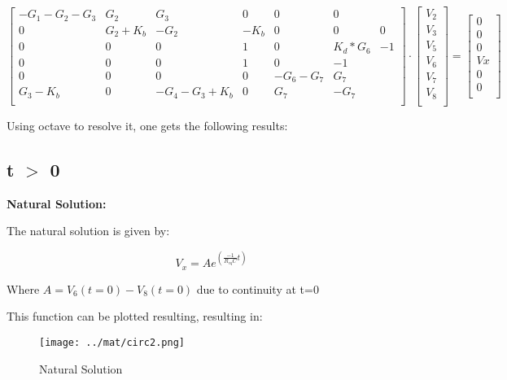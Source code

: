 \[
\begin{bmatrix}
-G_1-G_2-G_3 & G_2 & G_3 &  0 & 0 & 0\\
0 & G_2 + K_b & -G_2 & -K_b & 0 & 0 & 0\\
0 & 0 & 0 & 1 & 0 & K_d*G_6 & -1\\
0 & 0 & 0 & 1 & 0 & -1\\
0 & 0 & 0 & 0 & -G_6-G_7 & G_7\\
G_3-K_b & 0 & -G_4 - G_3+K_b & 0 & G_7 & -G_7\\

\end{bmatrix}
\cdot
\begin{bmatrix}
V_2\\
V_3\\
V_5\\
V_6\\
V_7\\
V_8\\
\end{bmatrix}
=
\begin{bmatrix}
0\\
0\\
0\\
Vx\\
0\\
0\\
\end{bmatrix}
\]

\vspace{1cm}

Using octave to resolve it, one gets the following results:

\vspace{0.5cm}


\subsection{t $>$ 0}


\textbf{Natural Solution:}

The natural solution is given by:

$$V_x = Ae^{(\frac{-1}{R_{eq}C}t)}$$

Where $A = V_6(t = 0) - V_8(t=0)$ due to continuity at t=0

This function can be plotted resulting, resulting in:

\begin{figure}[h!]
   \texttt{[image: ../mat/circ2.png]}
    \centering
    \caption{Natural Solution}  %
    \label{nat}
\end{figure}



